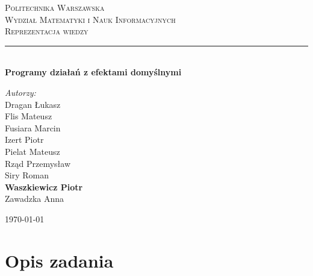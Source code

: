 \documentclass{article}
\begin{document}
	
\begin{titlepage}

\newcommand{\HRule}{\rule{\linewidth}{0.5mm}}
\newcommand{\Action}[1]{\textsc{#1}}

\center


\textsc{\LARGE Politechnika Warszawska}\\[5mm]
\textsc{\LARGE Wydział Matematyki i Nauk Informacyjnych}\\[3.5cm]
 

\textsc{\Huge Reprezentacja wiedzy}\\[0.5cm]


\HRule \\[0.4cm]
{ \LARGE \bfseries Programy działań z efektami domyślnymi}\\[2.5cm]
 

\begin{flushright}
\Large \emph{Autorzy:}\\[0.5cm]
Dragan Łukasz\\
Flis Mateusz\\
Fusiara Marcin\\
Izert Piotr\\
Pielat Mateusz\\
Rząd Przemysław\\
Siry Roman\\
\textbf{Waszkiewicz Piotr}\\
Zawadzka Anna\\

\end{flushright}

\vfill
{\large \today}\\[3cm]

\end{titlepage}
	
\newpage

\section{Opis zadania}
\end{document}

